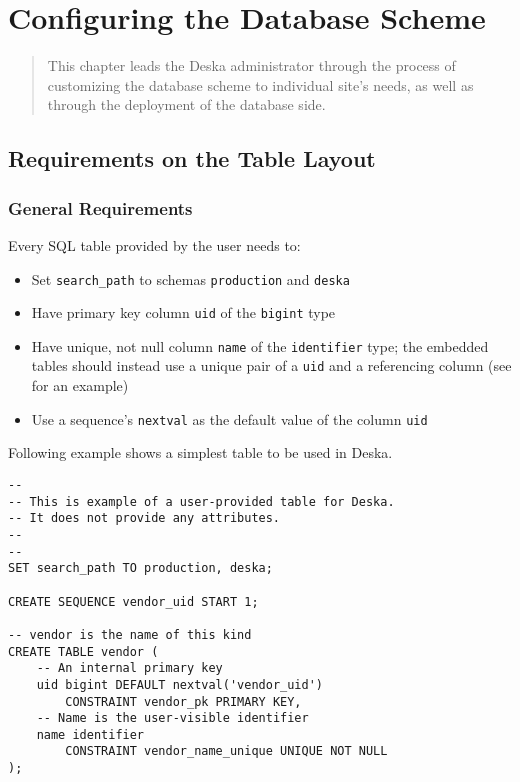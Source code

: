 \documentclass[deska]{subfiles}
\begin{document}
\chapter{Configuring the Database Scheme}
\label{sec:admin-dbscheme}

\begin{abstract}
This chapter leads the Deska administrator through the process of customizing the database scheme to individual site's
needs, as well as through the deployment of the database side.
\end{abstract}


\section{Requirements on the Table Layout}
\label{sec:db-scheme-req}

\subsection{General Requirements}
Every SQL table provided by the user needs to:

\begin{itemize}
    \item Set {\tt search\_path} to schemas {\tt production} and {\tt deska}
    \item Have primary key column {\tt uid} of the {\tt bigint} type
    \item Have unique, not null column {\tt name} of the {\tt identifier} type; the embedded tables should instead use a
        unique pair of a {\tt uid} and a referencing column (see  for an example)
    \item Use a sequence's {\tt nextval} as the default value of the column {\tt uid}
\end{itemize}

Following example shows a simplest table to be used in Deska.

\begin{verbatim}
--
-- This is example of a user-provided table for Deska.
-- It does not provide any attributes.
--
--
SET search_path TO production, deska;

CREATE SEQUENCE vendor_uid START 1;

-- vendor is the name of this kind
CREATE TABLE vendor (
    -- An internal primary key
    uid bigint DEFAULT nextval('vendor_uid')
        CONSTRAINT vendor_pk PRIMARY KEY,
    -- Name is the user-visible identifier
    name identifier
        CONSTRAINT vendor_name_unique UNIQUE NOT NULL
);
\end{verbatim}
\end{document}
